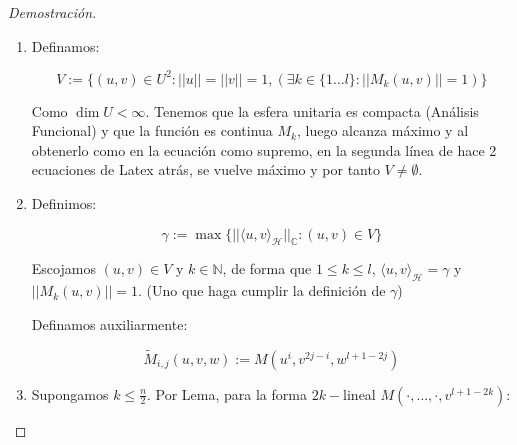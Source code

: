 \begin{proof}[Demostración]
\begin{enumerate}
		Además, se tiene que por reescritura:
		
		\begin{adjustwidth}{-2em}{0pt}
			\begin{align*}
				1= ||M||_{L^{l+1}(\mathcal{H},\dots,\mathcal{H}, \mathbb{C})} &= \sup \{||M(v,\dots,v,v_{k+1},\dots,v_{l+1})||_\mathbb{C} : ||v||_{U} = 1,||v_i||_{U} = 1 \, \, \forall i \in \{k+1,\dots, l+1\}\} \\
				&= \sup\{||M_k(v,u)||_{\mathbb{C}}: v,u \in \mathcal{H}, ||u||_U = ||v||_U = 1\}
			\end{align*}
		\end{adjustwidth}
		
		Donde:
		
		\begin{equation*}
			M_i(u,v) := M(u^i,v^{l+1-i})
		\end{equation*}
		
		\item Definamos:
		
		\begin{equation*}
			V := \{(u,v) \in U^2: ||u|| = ||v|| = 1, (\exists k \in \{1\dots l \}:||M_k(u,v)|| = 1) \}
		\end{equation*}
		
		Como $\dim U<\infty$. Tenemos que la esfera unitaria es compacta (Análisis Funcional) y que la función es continua $M_k$, luego alcanza máximo y al obtenerlo como en la ecuación como supremo, en la segunda línea de hace 2 ecuaciones de Latex atrás, se vuelve máximo y por tanto $V \neq \emptyset$.
		
		\item Definimos:
		
		\begin{equation*}
			\gamma := \max \{||\langle u,v\rangle _{\mathcal{H}}||_{\mathbb{C}}: (u,v) \in V \}
		\end{equation*}
		
		Escojamos $(u,v) \in V$ y $k\in \mathbb{N}$, de forma que $1\leq k\leq l$, $\langle u,v\rangle _{\mathcal{H}} = \gamma$ y $||M_k(u,v)|| = 1$. (Uno que haga cumplir la definición de $\gamma$) 
		
		Definamos auxiliarmente: 
		
		\begin{equation*}
			\tilde{M}_{i,j}(u,v,w) := M(u^i, v^{2j-i},w^{l+1-2j}) 
		\end{equation*}
		
		\item Supongamos $k \leq \frac{n}{2}$. Por Lema, para la forma $2k-$lineal $M(\cdot,\dots,\cdot,v^{l+1-2k})$:
		

\end{enumerate}
\end{proof}
